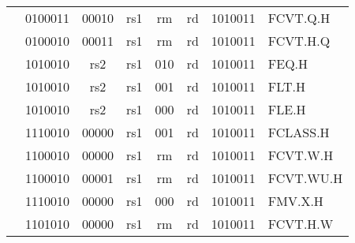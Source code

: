 \begin{table}[p]
\begin{small}
\begin{center}
\begin{tabular}{p{0in}p{0.4in}p{0.05in}p{0.05in}p{0.05in}p{0.05in}p{0.4in}p{0.6in}p{0.4in}p{0.6in}p{0.7in}l}
&
\multicolumn{4}{|c|}{0100011} &
\multicolumn{2}{c|}{00010} &
\multicolumn{1}{c|}{rs1} &
\multicolumn{1}{c|}{rm} &
\multicolumn{1}{c|}{rd} &
\multicolumn{1}{c|}{1010011} & FCVT.Q.H \\
\cline{2-11}


&
\multicolumn{4}{|c|}{0100010} &
\multicolumn{2}{c|}{00011} &
\multicolumn{1}{c|}{rs1} &
\multicolumn{1}{c|}{rm} &
\multicolumn{1}{c|}{rd} &
\multicolumn{1}{c|}{1010011} & FCVT.H.Q \\
\cline{2-11}


&
\multicolumn{4}{|c|}{1010010} &
\multicolumn{2}{c|}{rs2} &
\multicolumn{1}{c|}{rs1} &
\multicolumn{1}{c|}{010} &
\multicolumn{1}{c|}{rd} &
\multicolumn{1}{c|}{1010011} & FEQ.H \\
\cline{2-11}


&
\multicolumn{4}{|c|}{1010010} &
\multicolumn{2}{c|}{rs2} &
\multicolumn{1}{c|}{rs1} &
\multicolumn{1}{c|}{001} &
\multicolumn{1}{c|}{rd} &
\multicolumn{1}{c|}{1010011} & FLT.H \\
\cline{2-11}


&
\multicolumn{4}{|c|}{1010010} &
\multicolumn{2}{c|}{rs2} &
\multicolumn{1}{c|}{rs1} &
\multicolumn{1}{c|}{000} &
\multicolumn{1}{c|}{rd} &
\multicolumn{1}{c|}{1010011} & FLE.H \\
\cline{2-11}


&
\multicolumn{4}{|c|}{1110010} &
\multicolumn{2}{c|}{00000} &
\multicolumn{1}{c|}{rs1} &
\multicolumn{1}{c|}{001} &
\multicolumn{1}{c|}{rd} &
\multicolumn{1}{c|}{1010011} & FCLASS.H \\
\cline{2-11}


&
\multicolumn{4}{|c|}{1100010} &
\multicolumn{2}{c|}{00000} &
\multicolumn{1}{c|}{rs1} &
\multicolumn{1}{c|}{rm} &
\multicolumn{1}{c|}{rd} &
\multicolumn{1}{c|}{1010011} & FCVT.W.H \\
\cline{2-11}


&
\multicolumn{4}{|c|}{1100010} &
\multicolumn{2}{c|}{00001} &
\multicolumn{1}{c|}{rs1} &
\multicolumn{1}{c|}{rm} &
\multicolumn{1}{c|}{rd} &
\multicolumn{1}{c|}{1010011} & FCVT.WU.H \\
\cline{2-11}


&
\multicolumn{4}{|c|}{1110010} &
\multicolumn{2}{c|}{00000} &
\multicolumn{1}{c|}{rs1} &
\multicolumn{1}{c|}{000} &
\multicolumn{1}{c|}{rd} &
\multicolumn{1}{c|}{1010011} & FMV.X.H \\
\cline{2-11}


&
\multicolumn{4}{|c|}{1101010} &
\multicolumn{2}{c|}{00000} &
\multicolumn{1}{c|}{rs1} &
\multicolumn{1}{c|}{rm} &
\multicolumn{1}{c|}{rd} &
\multicolumn{1}{c|}{1010011} & FCVT.H.W \\
\cline{2-11}



\end{tabular}
\end{center}
\end{small}
\end{table}
